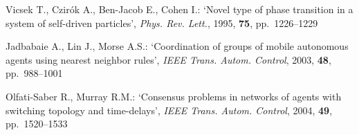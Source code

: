 \documentclass{cta-author}%
\begin{document}
\begin{thebibliography}{9}
Vicsek T., Czir\'{o}k A., Ben-Jacob E., Cohen I.: `Novel type of phase transition in a system of self-driven particles', \textit{Phys. Rev. Lett.}, 1995, \textbf{75}, pp.~1226--1229

Jadbabaie A., Lin J., Morse A.S.: `Coordination of groups of
mobile autonomous agents using nearest neighbor rules', \textit{IEEE
Trans. Autom. Control}, 2003, \textbf{48}, pp.~988--1001

Olfati-Saber R., Murray R.M.: `Consensus problems in networks
of agents with switching topology and time-delays', \textit{IEEE Trans.
Autom. Control}, 2004, \textbf{49}, pp.~1520--1533
\end{thebibliography}
\end{document}
